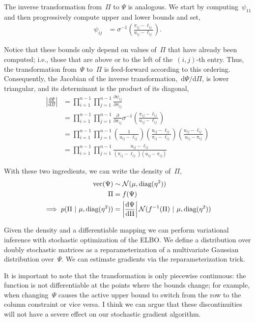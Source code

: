 \documentclass{article}
\begin{document}
The inverse transformation from~${\Pi}$ to $\Psi$ is analogous.
We start by computing~$\psi_{11}$ and then progressively compute
upper and lower bounds and set,
\begin{align}
\psi_{ij} &= \sigma^{-1} \left( \frac{{\pi}_{ij} - \ell_{ij}}{u_{ij} - \ell_{ij}} \right ).
\end{align}


Notice that these bounds only depend on values of~${\Pi}$ that
have already been computed; i.e., those that are above or to the left of
the~$(i,j)$-th entry. Thus, the transformation from~$\Psi$ to~${\Pi}$
is feed-forward according to this ordering.  Consequently, the
Jacobian of the inverse transformation,~$\mathrm{d}\Psi / \mathrm{d} \Pi$,
is lower triangular, and its determinant is the product of its diagonal,
\begin{align}
\left| \frac{\mathrm{d} \Psi } {\mathrm{d} \Pi} \right|
&= \prod_{i=1}^{n-1} \prod_{j=1}^{n-1} \frac{\partial \psi_{ij} }{\partial {\pi}_{ij}} \\
&= \prod_{i=1}^{n-1} \prod_{j=1}^{n-1} \frac{\partial}{\partial {\pi}_{ij}}
\sigma^{-1} \left( \frac{{\pi}_{ij} - \ell_{ij}}{u_{ij} - \ell_{ij}} \right ) \\
&= \prod_{i=1}^{n-1} \prod_{j=1}^{n-1}
\left( \frac{1}{u_{ij} - \ell_{ij}} \right )
\left( \frac{u_{ij} - \ell_{ij}}{{\pi}_{ij} - \ell_{ij}} \right )
\left( \frac{u_{ij} - \ell_{ij}}{u_{ij} - {\pi}_{ij}} \right ) \\
&= \prod_{i=1}^{n-1} \prod_{j=1}^{n-1}
\frac{u_{ij} - \ell_{ij}}{({\pi}_{ij} - \ell_{ij}) (u_{ij} - {\pi}_{ij})}
\end{align}

With these two ingredients, we can write the density of~${\Pi}$,
\begin{align}
  \text{vec} (\Psi) &\sim \mathcal{N}(\mu, \textrm{diag}(\eta^2))
  \\
  {\Pi} &= f(\Psi) \\
  \implies
  p(\Pi ~\vert~ \mu, \textrm{diag}(\eta^2)) &= \left|\frac{\mathrm{d} \Psi }{\mathrm{d} {\Pi}} \right|
  \mathcal{N}(f^{-1}({\Pi}) ~\vert~ \mu, \textrm{diag}(\eta^2))
\end{align}

Given the density and a differentiable mapping we can perform
variational inference with stochastic optimization of the ELBO.
We define a distribution over doubly stochastic matrices as a
reparameterization of a multivariate Gaussian distribution
over~$\Psi$. We can estimate gradients via the reparameterization
trick.

It is important to note that the transformation is only piecewise
continuous: the function is not differentiable at the points where
the bounds change; for example, when changing~$\Psi$ causes the
active upper bound to switch from the row to the column constraint
or vice versa.  I think we can argue that these discontinuities
will not have a severe effect on our stochastic gradient algorithm.



\end{document}
